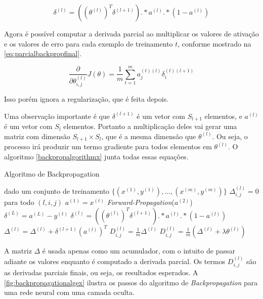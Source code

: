 \begin{equation}\label{eq:backpropagationfinal}
\delta^{(l)} = ((\theta^{(l)})^T \delta^{(l+1)}) .* a^{(l)} .* (1 - a^{(l)}) 
\end{equation}

Agora é possível computar a derivada parcial ao multiplicar os valores de ativação e os valores de erro para cada exemplo de treinamento $t$, conforme mostrado na \autoref{eq:parcialbackpropfinal}.

\begin{equation}\label{eq:parcialbackpropfinal}
\frac{\partial}{\partial\theta_{i,j}^{(l)}} J(\theta) = \frac{1}{m} \sum\limits_{t=1}^{m} a_j^{(t)(l)} \delta_i^{(t)(l+1)}
\end{equation}

Isso porém ignora a regularização, que é feita depois.

Uma observação importante é que $\delta^{(l+1)}$ é um vetor com $S_{l+1}$ elementos, e $a^{(l)}$ é um vetor com $S_l$ elementos. Portanto a multiplicação deles vai gerar uma matriz com dimensão $S_{l+1} \times S_l$, que é a mesma dimensão que $\theta^{(l)}$. Ou seja, o processo irá produzir um termo gradiente para todos elementos em $\theta^{(l)}$. O algoritmo \ref{backpropalgorithmx} junta todas essas equações.

\begin{algorithm} 
\caption{Algoritmo de Backpropagation} \label{backpropalgorithmx}
\begin{algorithmic}
	\State dado um conjunto de treinamento $\{(x^{(1)}, y^{(1)}), \ldots, (x^{(m)}, y^{(m)}) \}$
	\State $\Delta_{i,j}^{(l)} = 0$ para todo $(l, i, j)$
		\State $a^{(1)} = x^{(t)}$
		\State \textit{Forward-Propagation}($a^{(2)}$)
		\State $\delta^{(L)} = a^{(L)} - y^{(t)}$
      \State $\delta^{(l)} = ((\theta^{(l)})^T \delta^{(l+1)}) .* a^{(l)} .* (1 - a^{(l)})$
		  \State $\Delta^{(l)} = \Delta^{(l)} + \delta^{(l+1)}(a^{(l)})^T $
    \EndFor
	\EndFor
			\State $D_{i,j}^{(l)} = \frac{1}{m}\Delta^{(l)}$
		\Else
			\State $D_{i,j}^{(l)} = \frac{1}{m}(\Delta^{(l)} + \lambda\theta^{(l)})$
		\EndIf
\EndProcedure
\end{algorithmic}
\end{algorithm}

A matriz $\Delta$ é usada apenas como um acumulador, com o intuito de passar adiante os valores enquanto é computado a derivada parcial. Os termos $D_{i,j}^{(l)}$ são as derivadas parciais finais, ou seja, os resultados esperados. A \autoref{fig:backpropagationalgex} ilustra os passos do algoritmo de \textit{Backpropagation} para uma rede neural com uma camada oculta.

